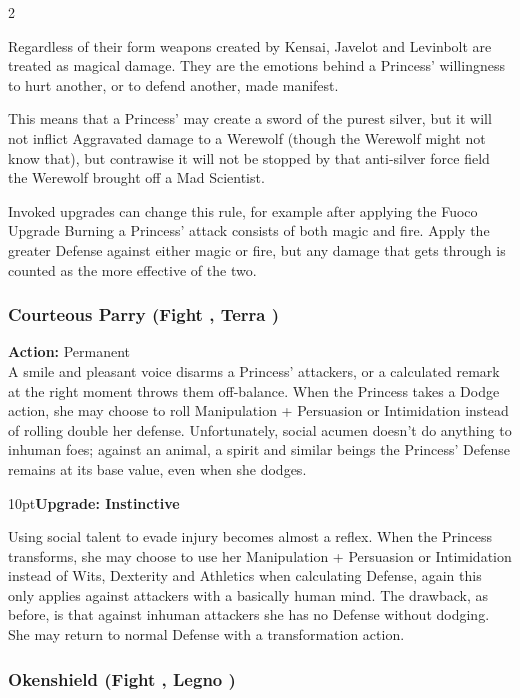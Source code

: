 \begin{multicols}{2}
\begin{mybox}
 Regardless of their form weapons created by Kensai, Javelot and Levinbolt are treated as magical damage. They are the emotions behind a Princess' willingness to hurt another, or to defend another, made manifest. 
  
 This means that a Princess' may create a sword of the purest silver, but it will not inflict Aggravated damage to a Werewolf (though the Werewolf might not know that), but contrawise it will not be stopped by that anti-silver force field the Werewolf brought off a Mad Scientist. 
 
 Invoked upgrades can change this rule, for example after applying the Fuoco Upgrade Burning a Princess' attack consists of both magic and fire. Apply the greater Defense against either magic or fire, but any damage that gets through is counted as the more effective of the two. 
\end{mybox}

\subsubsection*{Courteous Parry (Fight \textbullet, Terra \textbullet)}

\noindent \textbf{Action:} Permanent\\

\noindent A smile and pleasant voice disarms a Princess' attackers, or a calculated remark at the right moment throws them off-balance. When the Princess takes a Dodge action, she may choose to roll Manipulation + Persuasion or Intimidation instead of rolling double her defense. Unfortunately, social acumen doesn't do anything to inhuman foes; against an animal, a spirit and similar beings the Princess' Defense remains at its base value, even when she dodges.

\begin{myindentpar}{10pt}\textbf{Upgrade: Instinctive}

Using social talent to evade injury becomes almost a reflex. When the Princess transforms, she may choose to use her Manipulation + Persuasion or Intimidation instead of Wits, Dexterity and Athletics when calculating Defense, again this only applies against attackers with a basically human mind. The drawback, as before, is that against inhuman attackers she has no Defense without dodging. She may return to normal Defense with a transformation action.\end{myindentpar}

\subsubsection*{Okenshield (Fight \textbullet, Legno \textbullet)}


\end{multicols}
